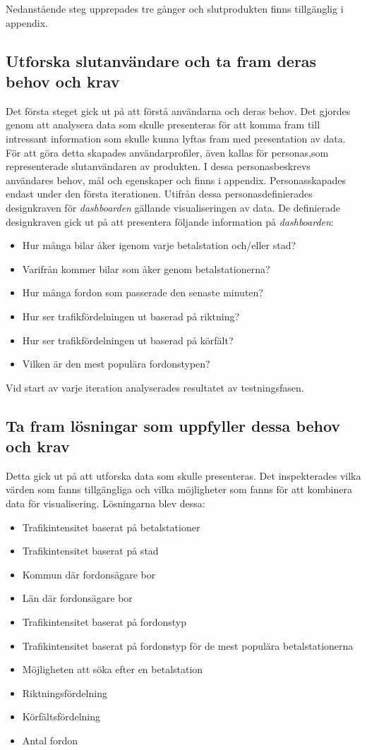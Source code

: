 \documentclass[12pt]{kththesis}
\begin{document}
Nedanstående steg upprepades tre gånger och slutprodukten finns tillgänglig i appendix.  

\subsection{ Utforska slutanvändare och ta fram deras behov och krav
}
Det första steget gick ut på att förstå användarna och deras behov. Det gjordes genom att analysera data som skulle presenteras för att komma fram till intressant information som skulle kunna lyftas fram med presentation av data. För att göra detta skapades användarprofiler, även kallas för personas,som representerade slutanvändaren av produkten. I dessa personasbeskrevs användares behov, mål och egenskaper och finns i appendix. Personasskapades endast under den första iterationen. Utifrån dessa personasdefinierades designkraven för \textit{dashboarden} gällande visualiseringen av data. De definierade designkraven gick ut på att presentera följande information på \textit{dashboarden}:

\begin{itemize}
\item Hur många bilar åker igenom varje betalstation och/eller stad?
\item Varifrån kommer bilar som åker genom betalstationerna? 
\item Hur många fordon som passerade den senaste minuten? 
\item Hur ser trafikfördelningen ut baserad på riktning? 
\item Hur ser trafikfördelningen ut baserad på körfält? 
\item Vilken är den mest populära fordonstypen?
\end{itemize}

Vid start av varje iteration analyserades resultatet av testningsfasen. 

\subsection{Ta fram lösningar som uppfyller dessa behov och krav }
Detta gick ut på att utforska data som skulle presenteras. Det inspekterades vilka värden som fanns tillgängliga och vilka möjligheter som fanns för att kombinera data för visualisering. Lösningarna blev dessa:
 
\begin{itemize}
\item Trafikintensitet baserat på betalstationer
\item Trafikintensitet baserat på stad
\item Kommun där fordonsägare bor
\item Län där fordonsägare bor
\item Trafikintensitet baserat på fordonstyp 
\item Trafikintensitet baserat på fordonstyp för de mest populära betalstationerna
\item Möjligheten att söka efter en betalstation
\item Riktningsfördelning
\item Körfältsfördelning
\item Antal fordon
\end{itemize}
\end{document}
